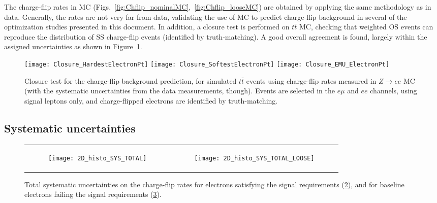 The charge-flip rates in MC (Figs.~\ref{fig:Chflip_nominalMC},~\ref{fig:Chflip_looseMC}) 
are obtained by applying the same methodology as in data. 
Generally, the rates are not very far from data, validating the use of MC to predict charge-flip background 
in several of the optimization studies presented in this document. 
In addition, a closure test is performed on $t\bar t$ MC, 
checking that weighted OS events can reproduce the distribution of SS charge-flip events (identified by truth-matching). 
A good overall agreement is found, largely within the assigned uncertainties
as shown in Figure~\ref{fig:ChargeFlip_ClosureTest}. 

\begin{figure}[htb!]
\centering
{\texttt{[image: Closure\_HardestElectronPt]}}
{\texttt{[image: Closure\_SoftestElectronPt]}}
{\texttt{[image: Closure\_EMU\_ElectronPt]}}
\caption{Closure test for the charge-flip background prediction, for simulated $t\bar t$ events 
using charge-flip rates measured in $Z\to ee$ MC 
(with the systematic uncertainties from the data measurements, though). 
Events are selected in the $e\mu$ and $ee$ channels, using signal leptons only, 
and charge-flipped electrons are identified by truth-matching. 
}
\label{fig:ChargeFlip_ClosureTest}
\end{figure}

\subsection*{Systematic uncertainties}
\label{subsec:chargeflip_uncertainties}

\begin{figure}[t!]
\centering
\begin{tabular}{rr}
\begin{subfigure}[b]{0.5\textwidth}
	\texttt{[image: 2D\_histo\_SYS\_TOTAL]}\caption{}\label{fig:bkg.chargeflip.2D_histo_SYS_TOTAL}
\end{subfigure} &
\begin{subfigure}[b]{0.5\textwidth}
	\texttt{[image: 2D\_histo\_SYS\_TOTAL\_LOOSE]}\caption{}\label{fig:bkg.chargeflip.2D_histo_SYS_TOTAL_LOOSE}
\end{subfigure}
\end{tabular}
\caption{Total systematic uncertainties on the charge-flip rates for electrons satisfying the signal requirements (\ref{fig:bkg.chargeflip.2D_histo_SYS_TOTAL}),
and for baseline electrons failing the signal requirements (\ref{fig:bkg.chargeflip.2D_histo_SYS_TOTAL_LOOSE}). 
}
\label{fig:ChFlip_SYS_Total}
\end{figure}

